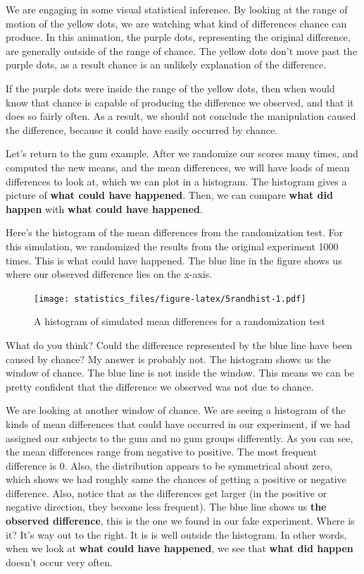 \documentclass[]{book}
\begin{document}
We are engaging in some visual statistical inference. By looking at the range of motion of the yellow dots, we are watching what kind of differences chance can produce. In this animation, the purple dots, representing the original difference, are generally outside of the range of chance. The yellow dots don't move past the purple dots, as a result chance is an unlikely explanation of the difference.

If the purple dots were inside the range of the yellow dots, then when would know that chance is capable of producing the difference we observed, and that it does so fairly often. As a result, we should not conclude the manipulation caused the difference, because it could have easily occurred by chance.

Let's return to the gum example. After we randomize our scores many times, and computed the new means, and the mean differences, we will have loads of mean differences to look at, which we can plot in a histogram. The histogram gives a picture of \textbf{what could have happened}. Then, we can compare \textbf{what did happen} with \textbf{what could have happened}.

Here's the histogram of the mean differences from the randomization test. For this simulation, we randomized the results from the original experiment 1000 times. This is what could have happened. The blue line in the figure shows us where our observed difference lies on the x-axis.

\begin{figure}
\centering
\texttt{[image: statistics\_files/figure-latex/5randhist-1.pdf]}
\caption{\label{fig:5randhist}A histogram of simulated mean differences for a randomization test}
\end{figure}

What do you think? Could the difference represented by the blue line have been caused by chance? My answer is probably not. The histogram shows us the window of chance. The blue line is not inside the window. This means we can be pretty confident that the difference we observed was not due to chance.

We are looking at another window of chance. We are seeing a histogram of the kinds of mean differences that could have occurred in our experiment, if we had assigned our subjects to the gum and no gum groups differently. As you can see, the mean differences range from negative to positive. The most frequent difference is 0. Also, the distribution appears to be symmetrical about zero, which shows we had roughly same the chances of getting a positive or negative difference. Also, notice that as the differences get larger (in the positive or negative direction, they become less frequent). The blue line shows us \textbf{the observed difference}, this is the one we found in our fake experiment. Where is it? It's way out to the right. It is is well outside the histogram. In other words, when we look at \textbf{what could have happened}, we see that \textbf{what did happen} doesn't occur very often.
\end{document}
